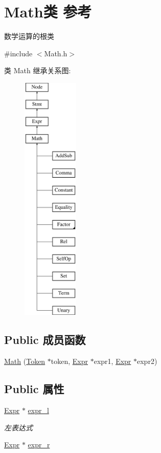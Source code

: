 \hypertarget{class_math}{}\section{Math类 参考}
\label{class_math}


数学运算的根类  




{\ttfamily \#include $<$Math.\+h$>$}

类 Math 继承关系图\+:\begin{figure}[H]
\begin{center}
\leavevmode
\includegraphics[height=12.000000cm]{class_math}
\end{center}
\end{figure}
\subsection*{Public 成员函数}
\begin{DoxyCompactItemize}
\item 
\hyperlink{class_math_af045a09f80d73b385d902041bc5cf41e}{Math} (\hyperlink{class_token}{Token} $\ast$token, \hyperlink{class_expr}{Expr} $\ast$expr1, \hyperlink{class_expr}{Expr} $\ast$expr2)
\end{DoxyCompactItemize}
\subsection*{Public 属性}
\begin{DoxyCompactItemize}
\item 
\hyperlink{class_expr}{Expr} $\ast$ \hyperlink{class_math_a551d177c9245212a8b5374ea1e4024ea}{expr\+\_\+l}\hypertarget{class_math_a551d177c9245212a8b5374ea1e4024ea}{}\label{class_math_a551d177c9245212a8b5374ea1e4024ea}

\begin{DoxyCompactList}\small\item\em 左表达式 \end{DoxyCompactList}\item 
\hyperlink{class_expr}{Expr} $\ast$ \hyperlink{class_math_a2e2eb1f4f47fd10466db783b20183307}{expr\+\_\+r}
\end{DoxyCompactItemize}
